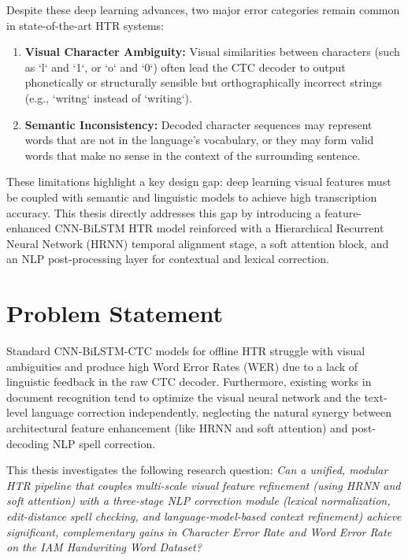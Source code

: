 Despite these deep learning advances, two major error categories remain common in state-of-the-art HTR systems:
\begin{enumerate}
    \item \textbf{Visual Character Ambiguity:} Visual similarities between characters (such as `l` and `1`, or `o` and `0`) often lead the CTC decoder to output phonetically or structurally sensible but orthographically incorrect strings (e.g., `writng` instead of `writing`).
    \item \textbf{Semantic Inconsistency:} Decoded character sequences may represent words that are not in the language's vocabulary, or they may form valid words that make no sense in the context of the surrounding sentence.
\end{enumerate}

These limitations highlight a key design gap: deep learning visual features must be coupled with semantic and linguistic models to achieve high transcription accuracy. This thesis directly addresses this gap by introducing a feature-enhanced CNN-BiLSTM HTR model reinforced with a Hierarchical Recurrent Neural Network (HRNN) temporal alignment stage, a soft attention block, and an NLP post-processing layer for contextual and lexical correction.

\section{Problem Statement}
Standard CNN-BiLSTM-CTC models for offline HTR struggle with visual ambiguities and produce high Word Error Rates (WER) due to a lack of linguistic feedback in the raw CTC decoder. Furthermore, existing works in document recognition tend to optimize the visual neural network and the text-level language correction independently, neglecting the natural synergy between architectural feature enhancement (like HRNN and soft attention) and post-decoding NLP spell correction. 

This thesis investigates the following research question: \textit{Can a unified, modular HTR pipeline that couples multi-scale visual feature refinement (using HRNN and soft attention) with a three-stage NLP correction module (lexical normalization, edit-distance spell checking, and language-model-based context refinement) achieve significant, complementary gains in Character Error Rate and Word Error Rate on the IAM Handwriting Word Dataset?}

